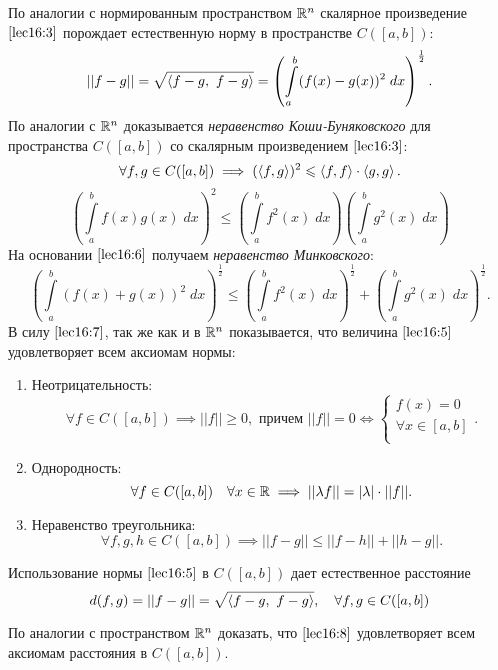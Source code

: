 \documentclass[../../main.tex]{subfiles}
\begin{document}
	 По аналогии с нормированным пространством $\mathbb{R}^n$ скалярное произведение
	  $\eqref{lec16:3}$ порождает естественную норму в пространстве $C(\left[a,
	   b\right])$:
	 \begin{equation}
	 \label{lec16:5}
	 ||f - g|| = \sqrt{\left\langle f - g,\ f - g \right\rangle} = \left(\int \limits_a^b (f(x) - 
	 g(x))^2
	  \; dx\right)^\frac{1}{2}.
	 \end{equation}
	 По аналогии с $\mathbb{R}^n$ доказывается \emph{неравенство Коши-Буняковского} для 
	 пространства
	  $C(\left[a, b\right])$ со скалярным произведением $\eqref{lec16:3}$:
	 \[ \forall f, g \in C(\left[a, b\right]) \implies (\left\langle f, g \right\rangle)^2 \leqslant 
	 \left\langle f, f \right\rangle\cdot \left\langle g, g \right\rangle.\]
	 \begin{equation}
	\label{lec16:6}
	 \left(\int\limits_a^bf(x)g(x)\; dx\right)^2 \le \left(\int \limits_a^b
	  f^2(x)\; dx\right)\left(\int \limits_a^b g^2(x)\; dx\right) 
	 \end{equation}
	 На основании $\eqref{lec16:6}$ получаем \emph{неравенство Минковского}:
	 \begin{equation}
	 \label{lec16:7}
	  \left(\int\limits_a^b(f(x) + g(x))^2\; dx\right)^\frac{1}{2} \le \left(\int
	   \limits_a^b f^2(x)\; dx\right)^\frac{1}{2} + \left(\int \limits_a^b 
	   g^2(x)\; dx\right) ^ \frac{1}{2}.
	 \end{equation}
	 В силу $\eqref{lec16:7}$, так же как и в $\mathbb{R}^n$ показывается, что величина
	  $\eqref{lec16:5}$ удовлетворяет всем аксиомам нормы:
	 \begin{enumerate}
	 \item Неотрицательность:
	 \[\forall f \in C(\left[a, b\right]) \implies ||f|| \geq 0, \text{ причем } 
	 ||f|| = 0 \iff \begin{cases}
	 f(x) = 0\\\forall x \in \left[a, b\right]\\
	 \end{cases}.\]
	 	\item Однородность:
	 \[\forall f \in C(\left[a, b\right]) \quad \forall x \in \mathbb{R} \implies 
	 ||\lambda
	  f|| = |\lambda| \cdot ||f||.\]
	 \item Неравенство треугольника:
	 \[\forall f, g, h \in C(\left[a, b\right]) \implies ||f - g|| \leq ||f - h||
	 + ||h - g||.\]
	 	\end{enumerate}
	 Использование нормы $\eqref{lec16:5}$ в $C(\left[a, b\right])$ дает 
	 естественное расстояние
	 \begin{equation}
	 \label{lec16:8}
	 d(f, g) = ||f - g|| = \sqrt{\left\langle f-g,\ f-g \right\rangle}, \quad
	 \forall f, g \in C(\left[a, b\right])
	 \end{equation}
	 \begin{exc}
	 По аналогии с пространством $\mathbb{R}^n$ доказать, что
	 $\eqref{lec16:8}$ удовлетворяет всем аксиомам расстояния в $C(\left[a, 
	 b\right])$.
	 \end{exc}
	
\end{document}
